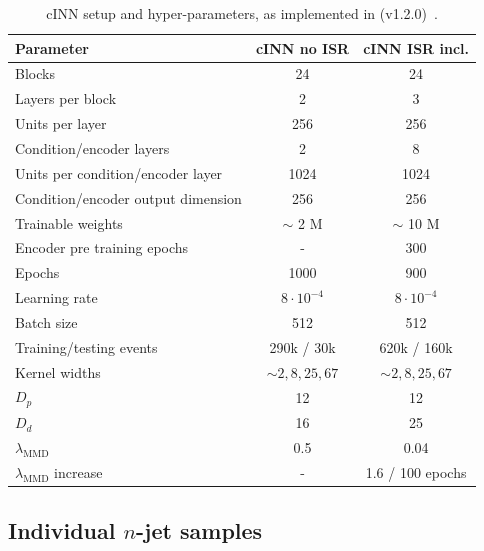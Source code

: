\begin{table}[b!]
\centering
\begin{small} \begin{tabular}{l|c c}
\toprule
Parameter & cINN no ISR& cINN ISR incl.  \\
\midrule
Blocks & 24 & 24 \\
Layers per block & 2 & 3 \\
Units per layer & 256 & 256 \\
Condition/encoder layers & 2 & 8 \\
Units per condition/encoder layer & 1024 & 1024 \\
Condition/encoder output dimension & 256 & 256 \\
Trainable weights & $\sim$ 2 M & $\sim$ 10 M \\
Encoder pre training epochs & - & 300\\
Epochs & 1000 & 900 \\
Learning rate & $8 \cdot 10^{-4}$ & $8 \cdot 10^{-4}$\\
Batch size & 512 & 512 \\
Training/testing events & 290k / 30k & 620k / 160k\\
Kernel widths & $\sim 2, 8, 25, 67$ & $\sim 2, 8, 25, 67$\\
$D_p$ & 12 & 12 \\
$D_d$ & 16 & 25 \\
$\lambda_\text{MMD}$ & 0.5 & 0.04 \\
$\lambda_\text{MMD}$ increase & - & 1.6 / 100 epochs\\
\bottomrule
\end{tabular} \end{small}
\caption{cINN setup and hyper-parameters, as implemented in
  \pytorch(v1.2.0)~\cite{pytorch}.}
\label{tab:cinn}
\end{table}

\subsection{Individual $n$-jet samples}
\label{sec:jets_indiv}

